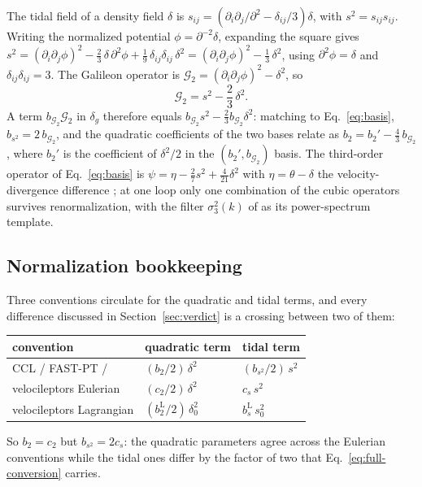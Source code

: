 \documentclass[11pt]{article}
\newcommand{\btwo}{b_2}            %
\newcommand{\bs}{b_{s^2}}          %
\newcommand{\btwoL}{b_2^{\mathrm{L}}}
\newcommand{\bsL}{b_s^{\mathrm{L}}}
\begin{document}
The tidal field of a density field $\delta$ is
$s_{ij} = (\partial_i\partial_j/\partial^2 - \delta_{ij}/3)\delta$,
with $s^2 = s_{ij}s_{ij}$.  Writing the normalized potential
$\phi = \partial^{-2}\delta$, expanding the square gives
$s^2 = (\partial_i\partial_j\phi)^2
 - \tfrac{2}{3}\,\delta\,\partial^2\phi
 + \tfrac{1}{9}\,\delta_{ij}\delta_{ij}\,\delta^2
 = (\partial_i\partial_j\phi)^2 - \tfrac{1}{3}\,\delta^2$,
using $\partial^2\phi = \delta$ and $\delta_{ij}\delta_{ij} = 3$.
The Galileon operator is
$\mathcal{G}_2 = (\partial_i\partial_j\phi)^2 - \delta^2$, so
\begin{equation}
\mathcal{G}_2 = s^2 - \frac{2}{3}\,\delta^2 .
\label{eq:g2-s2}
\end{equation}
A term $b_{\mathcal{G}_2}\mathcal{G}_2$ in $\delta_g$ therefore equals
$b_{\mathcal{G}_2} s^2 - \tfrac{2}{3}b_{\mathcal{G}_2}\delta^2$:
matching to Eq.~\eqref{eq:basis}, $\bs = 2\,b_{\mathcal{G}_2}$, and
the quadratic coefficients of the two bases relate as
$\btwo = \btwo' - \tfrac{4}{3}\,b_{\mathcal{G}_2}$, where $\btwo'$ is
the coefficient of $\delta^2/2$ in the
$(\btwo', b_{\mathcal{G}_2})$ basis.
The third-order operator of Eq.~\eqref{eq:basis} is
$\psi = \eta - \tfrac{2}{7}s^2 + \tfrac{4}{21}\delta^2$ with
$\eta = \theta - \delta$ the velocity-divergence difference
\cite{McDonaldRoy2009,ChenVlahWhite2020}; at one loop only one
combination of the cubic operators survives renormalization, with the
filter $\sigma_3^2(k)$ of \cite{Saito2014} as its power-spectrum
template.

\subsection{Normalization bookkeeping}

Three conventions circulate for the quadratic and tidal terms, and
every difference discussed in Section~\ref{sec:verdict} is a crossing
between two of them:
\begin{center}
\begin{tabular}{lll}
\toprule
convention & quadratic term & tidal term \\
\midrule
CCL / FAST-PT / \cite{Saito2014} & $(\btwo/2)\,\delta^2$ & $(\bs/2)\,s^2$ \\
velocileptors Eulerian \cite{ChenVlahWhite2020} & $(c_2/2)\,\delta^2$ & $c_s\,s^2$ \\
velocileptors Lagrangian \cite{ChenVlahWhite2020,Maus2024} &
$(\btwoL/2)\,\delta_0^2$ & $\bsL\,s_0^2$ \\
\bottomrule
\end{tabular}
\end{center}
So $\btwo = c_2$ but $\bs = 2c_s$: the quadratic parameters agree
across the Eulerian conventions while the tidal ones differ by the
factor of two that Eq.~\eqref{eq:full-conversion} carries.
\end{document}
